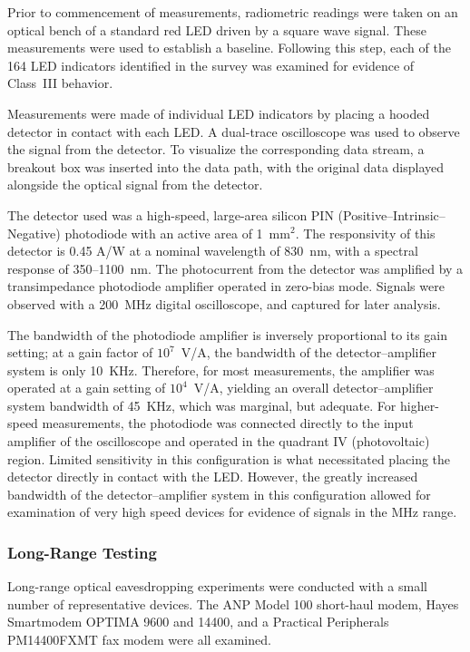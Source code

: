 \documentclass{acmtrans2e}
\begin{document}
Prior to commencement of measurements, radiometric readings were
taken on an optical bench of a standard 
red LED driven by a square wave signal.  These measurements were used to 
establish a baseline.  Following this step, each of the 164 LED 
indicators identified in the survey was examined for evidence of 
Class~III behavior.

Measurements were made of individual LED indicators by placing a hooded
detector in contact with each LED.  A dual-trace oscilloscope was used 
to observe the signal from the detector.  To visualize the corresponding 
data stream, a breakout box was inserted into the data path, with the 
original data displayed alongside the optical signal from the detector. 
 
The detector used was a high-speed, large-area silicon PIN
(Positive--Intrinsic--Negative) photodiode with an active area of
1~$\mathrm{mm}^2$.  
The responsivity of this detector is 0.45 A/W at a 
nominal wavelength of 830~nm, with a spectral response of 350--1100~nm.  
The photocurrent from the detector was amplified by a transimpedance 
photodiode amplifier operated in zero-bias mode.  Signals were 
observed with a 200~MHz digital oscilloscope, and captured for later
analysis.

The bandwidth of the 
photodiode amplifier is inversely proportional to its gain setting; at
a gain factor of $10^7$~V/A, the bandwidth of the
detector--amplifier system is only 10~KHz.  Therefore, for most
measurements, the 
amplifier was operated at a gain setting of $10^4$~V/A, yielding an 
overall detector--amplifier system bandwidth of 45~KHz, which was
marginal, but adequate.  For higher-speed 
measurements, the photodiode was connected directly to the input 
amplifier of the oscilloscope and operated in the quadrant IV 
(photovoltaic) region.  Limited sensitivity in this configuration 
is what necessitated placing the detector directly in contact with the 
LED.  However, the greatly increased bandwidth of the detector--amplifier 
system in this configuration allowed for examination of very high
speed devices for evidence of signals in the MHz range.

\subsubsection{Long-Range Testing}

Long-range optical eavesdropping experiments were conducted with a small 
number of representative devices.  The ANP Model 100 short-haul modem, 
Hayes Smartmodem OPTIMA 9600 and 14400, and a Practical Peripherals 
PM14400FXMT fax modem were all examined.
\end{document}
